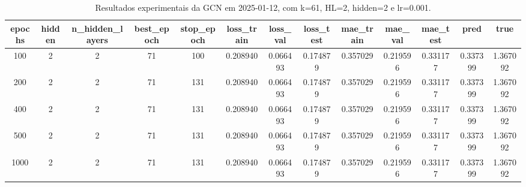 \begin{table}[h]
\centering
\caption{Resultados experimentais da GCN em 2025-01-12, com k=61, HL=2, hidden=2 e lr=0.001.}
\label{tab:gcn_results_k61_hl2_h2_d20250112}
\begin{tabular}{ccccccccccccc}
\toprule
epochs & hidden & n\_hidden\_layers & best\_epoch & stop\_epoch & loss\_train & loss\_val & loss\_test & mae\_train & mae\_val & mae\_test & pred & true \\
\midrule
100 & 2 & 2 & 71 & 100 & 0.208940 & 0.066493 & 0.174879 & 0.357029 & 0.219596 & 0.331177 & 0.337399 & 1.367092 \\
200 & 2 & 2 & 71 & 131 & 0.208940 & 0.066493 & 0.174879 & 0.357029 & 0.219596 & 0.331177 & 0.337399 & 1.367092 \\
400 & 2 & 2 & 71 & 131 & 0.208940 & 0.066493 & 0.174879 & 0.357029 & 0.219596 & 0.331177 & 0.337399 & 1.367092 \\
500 & 2 & 2 & 71 & 131 & 0.208940 & 0.066493 & 0.174879 & 0.357029 & 0.219596 & 0.331177 & 0.337399 & 1.367092 \\
1000 & 2 & 2 & 71 & 131 & 0.208940 & 0.066493 & 0.174879 & 0.357029 & 0.219596 & 0.331177 & 0.337399 & 1.367092 \\
\bottomrule
\end{tabular}
\end{table}
